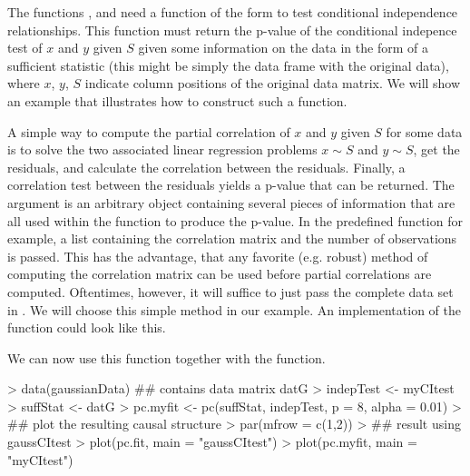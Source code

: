 \documentclass[article]{jss}
\begin{document}
The functions ,  and  need a
  function of the form  to test
  conditional independence relationships. This function must return
  the p-value of the conditional indepence test of $x$ and $y$ given
  $S$ given some information on the data in the form of a sufficient
  statistic (this might be simply the data frame with the original
  data), where $x$, $y$, $S$ indicate column positions of the original data
  matrix. We will show an example that illustrates how to construct such a
  function.

A simple way to compute the partial correlation of $x$ and $y$ given $S$
for some data is to solve the two associated linear regression problems $x
\sim S$ and $y \sim S$, get the residuals, and calculate the correlation
between the residuals. Finally, a correlation test between the residuals
yields a p-value that can be returned. The argument  is an
arbitrary object containing several pieces of information that are all used
within the function to produce the p-value. In the predefined function
 for example, a list containing the correlation matrix
and the number of observations is passed. This has the advantage, that any
favorite (e.g. robust) method of computing the correlation matrix can be
used before partial correlations are computed. Oftentimes, however, it will
suffice to just pass the complete data set in . We will
choose this simple method in our example. An implementation of the function
 could look like this.
\begin{Schunk}
\end{Schunk}
We can now use this function together with the  function.

\begin{Schunk}
\begin{Sinput}
> data(gaussianData) ## contains data matrix datG
> indepTest <- myCItest 
> suffStat <- datG
> pc.myfit <- pc(suffStat, indepTest, p = 8, alpha = 0.01)
> ## plot the resulting causal structure
> par(mfrow = c(1,2))
> ## result using gaussCItest
> plot(pc.fit, main = "gaussCItest")
> plot(pc.myfit, main = "myCItest")
\end{Sinput}
\end{Schunk}
\end{document}
